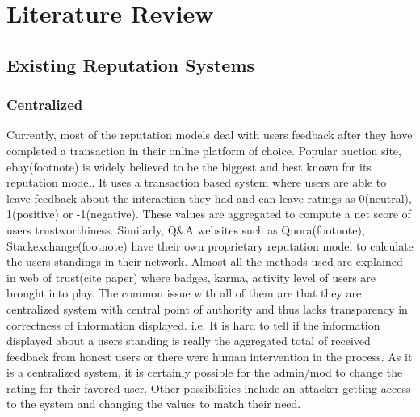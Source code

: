 \chapter{Literature Review} \label{ch:litrev}
\section{Existing Reputation Systems}
\subsection{Centralized}
Currently, most of the reputation models deal with users feedback after they 
have completed a transaction in their online platform of choice. Popular auction 
site, ebay(footnote) is widely believed to be the biggest and best known for its
reputation model. It uses a transaction based system where users are able to leave
feedback about the interaction they had and can leave ratings as 0(neutral),
1(positive) or -1(negative). These values are aggregated to compute a net score of
users trustworthiness.
Similarly, Q\&A websites such as Quora(footnote), Stackexchange(footnote) have their own 
proprietary reputation model to calculate the users standings in their network. 
Almost all the methods used are explained in web of trust(cite paper) where 
badges, karma, activity level of users are brought into play. The common issue 
with all of them are that they are centralized system with central point of
authority and thus lacks transparency in correctness of information displayed.
i.e. It is hard to tell if the information displayed about a users standing is 
really the aggregated total of received feedback from honest users or there 
were human intervention in the process. As it is a centralized system, it is 
certainly possible for the admin/mod to change the rating for their 
favored user. Other possibilities include an attacker getting access to the 
system and changing the values to match their need. 



